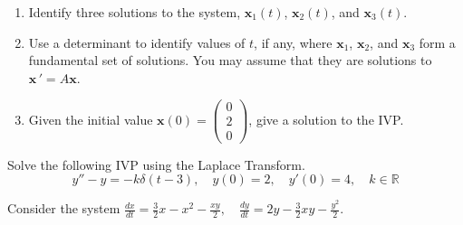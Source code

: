 \documentclass[11pt]{exam}
\begin{document}
\begin{questions}
    \begin{enumerate}[label=\roman*)]
      \item Identify three solutions to the system, $\mathbf x_1(t)$, $\mathbf x_2(t)$, and $\mathbf x_3(t)$. 
      \vspace{3cm} 
      \item Use a determinant to identify values of $t$, if any, where $\mathbf x_1$, $\mathbf x_2$, and $\mathbf x_3$ form a fundamental set of solutions. You may assume that they are solutions to $\mathbf x \, ' = A\mathbf x$. 
      \vspace{3cm}
      \item Given the initial value $\mathbf x(0) = \begin{pmatrix}0\\2\\0\end{pmatrix}$, give a solution to the IVP.  
      
    \end{enumerate}    
    
    \newpage \InitialsLeft
    \question[6] Solve the following IVP using the Laplace Transform. 
        $$y''-y=-k\delta(t-3), \quad y(0)=2,\quad y'(0)=4, \quad k \in \mathbb R$$  %
      
    
    
    
\newpage \InitialsRight
    \question[10] 
    Consider the system $\displaystyle \frac{dx}{dt} = \frac32 x - x^2 - \frac{xy}{2} , \quad \frac{dy}{dt} = 2y - \frac 32 xy - \frac{y^2}{2}$. %
    
\newpage \InitialsLeft \\ \LastPage     
    


  

\end{questions}
\end{document}
